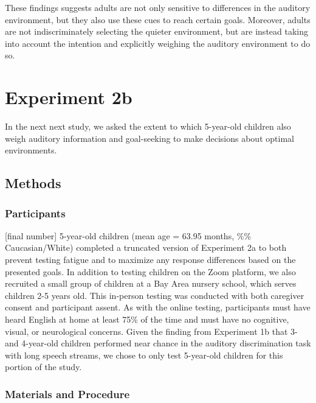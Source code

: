 \documentclass[10pt, letterpaper]{article}
\begin{document}
These findings suggests adults are not only sensitive to differences in
the auditory environment, but they also use these cues to reach certain
goals. Moreover, adults are not indiscriminately selecting the quieter
environment, but are instead taking into account the intention and
explicitly weighing the auditory environment to do so.

\hypertarget{experiment-2b}{%
\section{\texorpdfstring{\textbf{Experiment
2b}}{Experiment 2b}}\label{experiment-2b}}

In the next next study, we asked the extent to which 5-year-old children
also weigh auditory information and goal-seeking to make decisions about
optimal environments.

\hypertarget{methods-3}{%
\subsection{\texorpdfstring{\textbf{Methods}}{Methods}}\label{methods-3}}

\hypertarget{participants-3}{%
\subsubsection{Participants}\label{participants-3}}

{[}final number{]} 5-year-old children (mean age = 63.95 months, \%\%
Caucasian/White) completed a truncated version of Experiment 2a to both
prevent testing fatigue and to maximize any response differences based
on the presented goals. In addition to testing children on the Zoom
platform, we also recruited a small group of children at a Bay Area
nursery school, which serves children 2-5 years old. This in-person
testing was conducted with both caregiver consent and participant
assent. As with the online testing, participants must have heard English
at home at least 75\% of the time and must have no cognitive, visual, or
neurological concerns. Given the finding from Experiment 1b that 3- and
4-year-old children performed near chance in the auditory discrimination
task with long speech streams, we chose to only test 5-year-old children
for this portion of the study.

\hypertarget{materials-and-procedure-3}{%
\subsubsection{Materials and
Procedure}\label{materials-and-procedure-3}}
\end{document}
